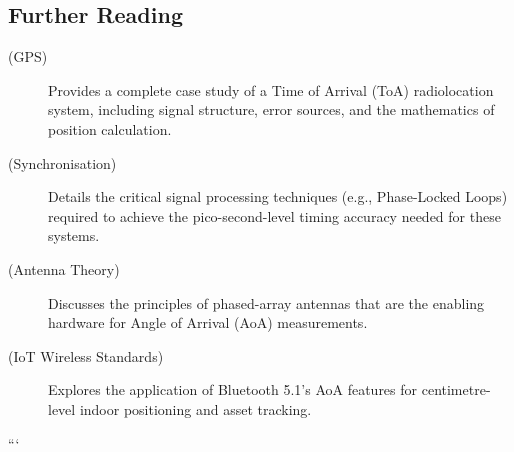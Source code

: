 \begin{importantbox}
\section*{Further Reading}
\begin{description}
    \item[ (GPS)] Provides a complete case study of a Time of Arrival (ToA) radiolocation system, including signal structure, error sources, and the mathematics of position calculation.
    \item[ (Synchronisation)] Details the critical signal processing techniques (e.g., Phase-Locked Loops) required to achieve the pico-second-level timing accuracy needed for these systems.
    \item[ (Antenna Theory)] Discusses the principles of phased-array antennas that are the enabling hardware for Angle of Arrival (AoA) measurements.
    \item[ (IoT Wireless Standards)] Explores the application of Bluetooth 5.1's AoA features for centimetre-level indoor positioning and asset tracking.
\end{description}
\end{importantbox}```